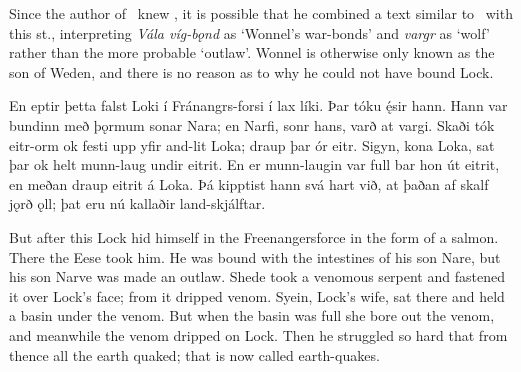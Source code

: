 Since the author of \Gylfaginning\ knew \Voluspa, it is possible that he combined a text similar to \FraLoka\ with this st., interpreting \emph{Vála víg-bǫnd} as ‘Wonnel’s war-bonds’ and \emph{vargr} as ‘wolf’ rather than the more probable ‘outlaw’. Wonnel is otherwise only known as the son of Weden, and there is no reason as to why he could not have bound Lock.

\sectionline

\bpg\bpa En eptir þetta falst Loki í Fránangrs-forsi í lax líki. Þar tóku ę́sir hann. Hann var bundinn með þǫrmum sonar Nara; en Narfi, sonr hans, varð at vargi. Skaði tók eitr-orm ok festi upp yfir and-lit Loka; draup þar ór eitr. Sigyn, kona Loka, sat þar ok helt munn-laug undir eitrit. En er munn-laugin var full bar hon út eitrit, en meðan draup eitrit á Loka. Þá kipptist hann svá hart við, at þaðan af skalf jǫrð ǫll; þat eru nú kallaðir land-skjálftar.\epa

\bpb But after this Lock hid himself in the Freenangersforce in the form of a salmon. There the Eese took him. He was bound with the intestines of his son Nare, but his son Narve was made an outlaw. Shede took a venomous serpent and fastened it over Lock’s face; from it dripped venom. Syein, Lock’s wife, sat there and held a basin under the venom. But when the basin was full she bore out the venom, and meanwhile the venom dripped on Lock. Then he struggled so hard that from thence all the earth quaked; that is now called earth-quakes.\epb\epg

\sectionline
